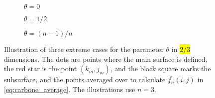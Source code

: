 \begin{figure}[htpb]%
    \centering%
    \vspace{1em}%
    \begin{subfigure}[b]{0.25\textwidth}%
        \caption{$\theta = 0$}%
        \label{fig:DMA_theta_a}%
    \end{subfigure}%
    \hspace{0.1\textwidth}%
    \begin{subfigure}[b]{0.25\textwidth}%
        \caption{$\theta = 1/2$}%
        \label{fig:DMA_theta_b}%
    \end{subfigure}%
    \hspace{0.1\textwidth}%
    \begin{subfigure}[b]{0.25\textwidth}%
        \caption{$\theta = (n-1)/n$}%
        \label{fig:DMA_theta_c}%
    \end{subfigure}%
        \caption{%
        Illustration of three extreme cases for the parameter $\theta$ in \hl{2/3} dimensions. The dots are points where the main surface is defined, the red star is the point $(k_m,j_m)$, and the black square marks the subsurface, and the points averaged over to calculate $\bar {f_n}(i,j)$ in \cref{eq:carbone_average}. The illustrations use $n = 3$.%
        \label{fig:DMA_theta}%
    }%
\end{figure}%

